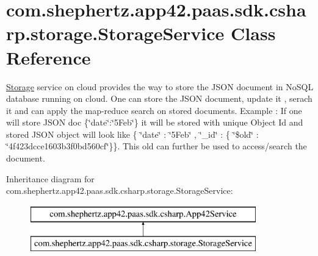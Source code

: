 \hypertarget{classcom_1_1shephertz_1_1app42_1_1paas_1_1sdk_1_1csharp_1_1storage_1_1_storage_service}{\section{com.\+shephertz.\+app42.\+paas.\+sdk.\+csharp.\+storage.\+Storage\+Service Class Reference}
\label{classcom_1_1shephertz_1_1app42_1_1paas_1_1sdk_1_1csharp_1_1storage_1_1_storage_service}
}


\hyperlink{classcom_1_1shephertz_1_1app42_1_1paas_1_1sdk_1_1csharp_1_1storage_1_1_storage}{Storage} service on cloud provides the way to store the J\+S\+O\+N document in No\+S\+Q\+L database running on cloud. One can store the J\+S\+O\+N document, update it , serach it and can apply the map-\/reduce search on stored documents. Example \+: If one will store J\+S\+O\+N doc \{\char`\"{}date\char`\"{}\+:\char`\"{}5\+Feb\char`\"{}\} it will be stored with unique Object Id and stored J\+S\+O\+N object will look like \{ \char`\"{}date\char`\"{} \+: \char`\"{}5\+Feb\char`\"{} , \char`\"{}\+\_\+id\char`\"{} \+: \{ \char`\"{}\$old\char`\"{} \+: \char`\"{}4f423dcce1603b3f0bd560cf\char`\"{}\}\}. This old can further be used to access/search the document.  


Inheritance diagram for com.\+shephertz.\+app42.\+paas.\+sdk.\+csharp.\+storage.\+Storage\+Service\+:\begin{figure}[H]
\begin{center}
\leavevmode
\includegraphics[height=2.000000cm]{classcom_1_1shephertz_1_1app42_1_1paas_1_1sdk_1_1csharp_1_1storage_1_1_storage_service}
\end{center}
\end{figure}
